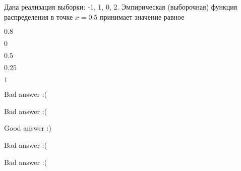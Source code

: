 
\begin{question}
Дана реализация выборки: -1, 1, 0, 2. Эмпирическая (выборочная) функция
распределения в точке \(x=0.5\) принимает значение равное
\begin{answerlist}
  \item \(0.8\)
  \item \(0\)
  \item \(0.5\)
  \item \(0.25\)
  \item \(1\)
\end{answerlist}
\end{question}

\begin{solution}
\begin{answerlist}
  \item Bad answer :(
  \item Bad answer :(
  \item Good answer :)
  \item Bad answer :(
  \item Bad answer :(
\end{answerlist}
\end{solution}

